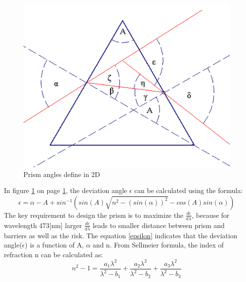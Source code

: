\begin{figure}[ht!]
\centering
\includegraphics[scale = 0.8]{chapters/img/Prism2D.png}
\caption{Prism angles define in 2D}
\label{fig:prism2D}
\end{figure} 
In figure \ref{fig:prism2D} on page \ref{fig:prism2D}, the deviation angle $\epsilon$ can be calculated using the formula\cite{prism_angle_calculation}:
\begin{equation}
\label{epsilon}
\epsilon = \alpha - A + sin^{-1}(sin(A)\sqrt{n^2 - (sin(\alpha))^2} - cos(A)sin(\alpha))
\end {equation}
The key requirement to design the prism is to maximize the $\frac{d\epsilon}{d\lambda}$,  because for wavelength 473[nm] larger $\frac{d\epsilon}{d\lambda}$ leads to smaller distance between prism and barriers as well as the risk. The equation \ref{epsilon} indicates that the deviation angle($\epsilon$) is a function of A, $\alpha$ and n. From Sellmeier formula\cite{prism_book}, the index of refraction n can be calculated as:
\begin{equation}
\label{index_refraction}
n^2 - 1 = \frac{a_{1}\lambda^2}{\lambda^2-b_{1}} + \frac{a_{2}\lambda^2}{\lambda^2-b_{2}} + \frac{a_{3}\lambda^2}{\lambda^2-b_{3}}
\end {equation}
